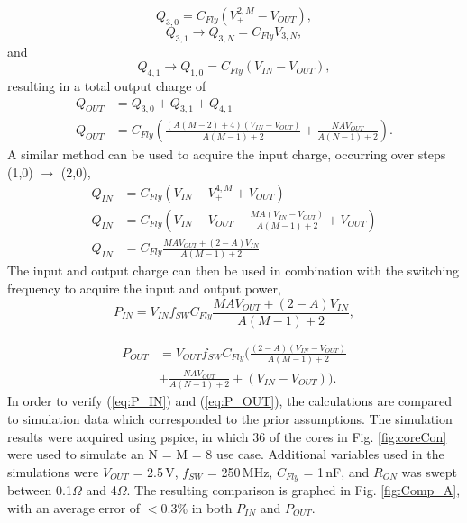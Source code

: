 \documentclass[conference]{IEEEtran}
\begin{document}
	\begin{equation}
	Q_{3,0} = C_{Fly}(V_+^{2,M} - V_{OUT}),
	\end{equation}
	\begin{equation}
	Q_{3,1} \rightarrow  Q_{3,N} = C_{Fly}V_{3,N},
	\end{equation}
	and
	\begin{equation}
	Q_{4,1} \rightarrow  Q_{1,0} = C_{Fly}(V_{IN} - V_{OUT}),
	\end{equation}
	resulting in a total output charge of 
	\begin{equation}
	\begin{split}
	Q_{OUT}\! &= Q_{3,0} + Q_{3,1} + Q_{4,1}\\
	Q_{OUT}\! &= \! C_{Fly}\!\left(\tfrac{(A(M-2) + 4)(V_{IN} - V_{OUT})}{A(M-1) + 2}\! + \! \tfrac{NAV_{OUT}}{A(N-1) + 2}\right).
	\end{split}
 	\end{equation}
 	A similar method can be used to acquire the input charge, occurring over steps (1,0) $\rightarrow$ (2,0),
 	\begin{equation}
 	\begin{split}
 	Q_{IN} &= C_{Fly}\left(V_{IN} - V_+^{4,M} + V_{OUT}\right) \\
 	Q_{IN} &= C_{Fly}\!\left(V_{IN} - V_{OUT} - \tfrac{MA(V_{IN}\! -\!V_{OUT})}{A(M-1) + 2} + V_{OUT}\!\right) \\
 	Q_{IN} &= C_{Fly}\tfrac{MAV_{OUT} + (2-A)V_{IN}}{A(M-1) + 2}
 	\end{split}
 	\end{equation}
 	The input and output charge can then be used in combination with the switching frequency to acquire the input and output power,
 	\begin{equation}
 	P_{IN} = V_{IN}f_{SW}C_{Fly}\frac{MAV_{OUT} + (2-A)V_{IN}}{A(M-1) + 2},
 	\label{eq:P_IN}
 	\end{equation}
 	
 	\begin{equation}
 	\begin{split}
 	P_{OUT} &= V_{OUT}f_{SW}C_{Fly}\Big(\tfrac{(2-A)(V_{IN} - V_{OUT})}{A(M-1) + 2} \\ 
 	&+ \tfrac{NAV_{OUT}}{A(N-1) + 2} + (V_{IN} - V_{OUT})\Big).
 	\end{split} 	
 	\label{eq:P_OUT}
 	\end{equation}
 	In order to verify (\ref{eq:P_IN}) and (\ref{eq:P_OUT}), the calculations are compared to simulation data which corresponded to the prior assumptions. The simulation results were acquired using pspice, in which 36 of the cores in Fig. \ref{fig:coreCon} were used to simulate an N = M = 8 use case. Additional variables used in the simulations were $V_{OUT}$ = 2.5$\,$V, $f_{SW}$ = 250$\,$MHz, $C_{Fly}$ = 1$\,$nF, and $R_{ON}$ was swept between 0.1$\Omega$ and 4$\Omega$. The resulting comparison is graphed in Fig. \ref{fig:Comp_A}, with an average error of $<$0.3\% in both $P_{IN}$ and $P_{OUT}$.
 	
\end{document}
